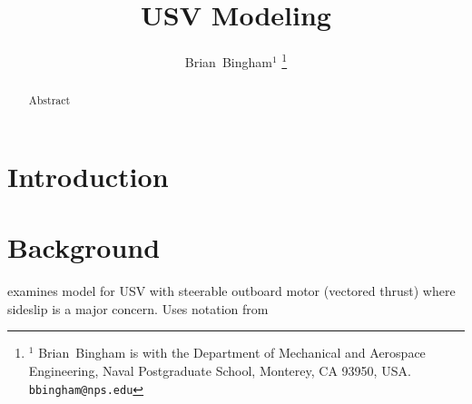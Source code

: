 \documentclass[11pt,draftcls,journal,onecolumn]{../latexlib/latex_ieee/IEEEtran}
\begin{document}
\newtheorem{remark}{Remark}
\renewcommand{\theremark}{\unskip}



%


\newcommand{\SF}{0.2}
\newcommand{\SFb}{0.45}
\newcommand{\SFPic}{0.45}
\newcommand{\SFPlot}{0.45}
\newcommand{\SFc}{0.25}
\newcommand{\FigWidth}{\SFb}

\newcommand{\scaleOneTwo}[2] {\scalebox{#1}}

\graphicspath{{./figs/}}

\title{USV Modeling}

\author{Brian~Bingham$^{1}$%
\thanks{$^{1}$ Brian~Bingham is with the Department of Mechanical and Aerospace Engineering, Naval Postgraduate School, Monterey, CA 93950, USA. {\tt\small bbingham@nps.edu}}%
}

\maketitle

\begin{abstract}
Abstract
\end{abstract}

\IEEEpeerreviewmaketitle

\section{Introduction}

\section{Background}

\cite{sonnenburg03modeling} examines model for USV with steerable outboard motor (vectored thrust) where sideslip is a major concern.  Uses notation from \cite{fossen94guidance}
\end{document}
